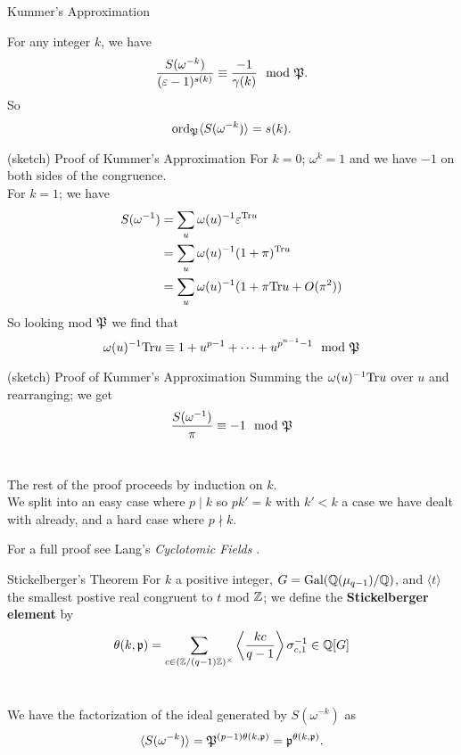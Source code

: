 \documentclass[presentation]{beamer}
\begin{document}
\begin{frame}{Kummer's Approximation}
\begin{theorem}
For any integer $k$, we have \[\frac{S(\omega^{-k})}{(\varepsilon - 1)^{s(k)}} \equiv \frac{-1}{\gamma(k)} \mod {\mathfrak{P}}.\]
So \[\textrm{ord}_{\mathfrak{P}} \langle S(\omega^{-k} ) \rangle= s(k).\]
\end{theorem}
\end{frame}

\begin{frame}{(sketch) Proof of Kummer's Approximation}
For $k =0$; $\omega^k = 1$ and we have $-1$ on both sides of the congruence.\\
\pause
\vspace{0.5cm}
For $k=1$; we have \begin{align*}
S(\omega^{-1}) &= \sum_u \omega(u)^{-1} \varepsilon^{\textrm{Tr} u} \\
&= \sum_u \omega(u)^{-1} (1 + \pi)^{\textrm{Tr} u} \\
&= \sum_u \omega(u)^{-1} ( 1 + \pi \textrm{Tr} u + O(\pi^2))
\end{align*}
\pause
\vspace{0.5cm}
So looking mod $\mathfrak{P}$ we find that \[\omega(u)^{-1} \textrm{Tr} u \equiv 1 + u^{p-1} + \cdots + u^{p^{n-1} -1} \mod {\mathfrak{P}}\]
\end{frame}

\begin{frame}{(sketch) Proof of Kummer's Approximation}
Summing the $\omega(u)^{-1} \textrm{Tr} u$ over $u$ and rearranging; we get \[ \frac{S(\omega^{-1})}{\pi} \equiv -1 \mod {\mathfrak{P}}\]\\
\pause
\vspace{0.5cm}

The rest of the proof proceeds by induction on $k$. 
\\
\pause
\vspace{0.5cm}
We split into an easy case where $p \mid k$ so $pk' = k$ with $k' < k$ a case we have dealt with already, and a hard case where $p \nmid k$.

For a full proof see Lang's \textit{Cyclotomic Fields} \cite{Lang1990}.

\end{frame}

\begin{frame}{Stickelberger's Theorem}
For  $k$ a positive integer, $G = \textrm{Gal}(\mathbb{Q}(\mu_{q-1})/\mathbb{Q})$, and $\langle t \rangle$ the smallest postive real congruent to $t$ mod $\mathbb{Z}$; we define the \textbf{Stickelberger element} by \[\theta(k,\mathfrak{p}) = \sum_{c \in (\mathbb{Z}/(q-1)\mathbb{Z})^\times} \left \langle \frac{kc}{q-1}\right \rangle \sigma_{c,1}^{-1} \in \mathbb{Q}[G]\]
\\
\pause
\vspace{0.5cm}
\begin{theorem}
We have the factorization of the ideal generated by $S(\omega^{-k})$ as \[\langle S(\omega^{-k})\rangle = \mathfrak{P}^{(p-1)\theta(k, \mathfrak{p})} = \mathfrak{p}^{\theta(k,\mathfrak{p})}.\]
\end{theorem}
\end{frame}
\end{document}
